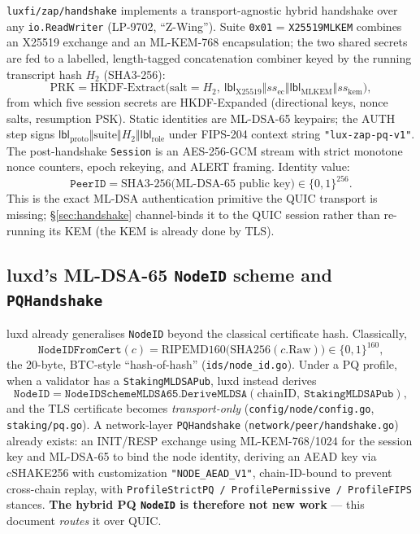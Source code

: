 \documentclass[11pt,a4paper]{article}
\newcommand{\msg}[1]{\textsf{#1}}
\newcommand{\code}[1]{\texttt{#1}}
\begin{document}
\code{luxfi/zap/handshake} implements a transport-agnostic hybrid
handshake over any \code{io.ReadWriter} (LP-9702, ``Z-Wing''). Suite
\code{0x01} = \code{X25519MLKEM} combines an X25519 exchange and an
ML-KEM-768 encapsulation; the two shared secrets are fed to a labelled,
length-tagged concatenation combiner keyed by the running transcript
hash $H_2$ (SHA3-256):
\[
  \mathrm{PRK} = \mathrm{HKDF\text{-}Extract}\bigl(\text{salt}=H_2,\
  \mathsf{lbl}_{\text{X25519}}\Vert ss_{\text{ec}} \Vert
  \mathsf{lbl}_{\text{MLKEM}}\Vert ss_{\text{kem}}\bigr),
\]
from which five session secrets are HKDF-Expanded (directional keys,
nonce salts, resumption PSK). Static identities are ML-DSA-65 keypairs;
the \msg{AUTH} step signs
$\mathsf{lbl}_{\text{proto}}\Vert\text{suite}\Vert H_2\Vert\mathsf{lbl}_{\text{role}}$
under FIPS-204 context string \code{"lux-zap-pq-v1"}. The post-handshake
\code{Session} is an AES-256-GCM stream with strict monotone nonce
counters, epoch rekeying, and \msg{ALERT} framing. Identity value:
\[
  \code{PeerID} = \mathrm{SHA3\text{-}256}\bigl(\text{ML-DSA-65 public key}\bigr)\in\{0,1\}^{256}.
\]
This is the exact ML-DSA authentication primitive the QUIC transport is
missing; \S\ref{sec:handshake} channel-binds it to the QUIC session
rather than re-running its KEM (the KEM is already done by TLS).

\subsection{luxd's ML-DSA-65 \texttt{NodeID} scheme and \texttt{PQHandshake}}\label{sec:proven-pqid}

luxd already generalises \code{NodeID} beyond the classical certificate
hash. Classically,
\[
  \code{NodeIDFromCert}(c) = \mathrm{RIPEMD160}\bigl(\mathrm{SHA256}(c.\text{Raw})\bigr)\in\{0,1\}^{160},
\]
the 20-byte, BTC-style ``hash-of-hash''
(\code{ids/node\_id.go}). Under a PQ profile, when a validator has a
\code{StakingMLDSAPub}, luxd instead derives
\[
  \code{NodeID} = \code{NodeIDSchemeMLDSA65.DeriveMLDSA}(\text{chainID},\ \code{StakingMLDSAPub}),
\]
and the TLS certificate becomes \emph{transport-only}
(\code{config/node/config.go}, \code{staking/pq.go}). A network-layer
\code{PQHandshake} (\code{network/peer/handshake.go}) already exists:
an \msg{INIT}/\msg{RESP} exchange using ML-KEM-768/1024 for the session
key and ML-DSA-65 to bind the node identity, deriving an AEAD key via
cSHAKE256 with customization \code{"NODE\_AEAD\_V1"}, chain-ID-bound to
prevent cross-chain replay, with \code{ProfileStrictPQ /
ProfilePermissive / ProfileFIPS} stances. \textbf{The hybrid PQ
\code{NodeID} is therefore not new work} --- this document \emph{routes}
it over QUIC.
\end{document}
